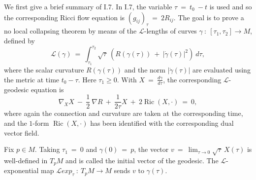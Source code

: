 \documentclass[12pt]{amsart}
\newcommand{\Ric}{\operatorname{Ric}}
\newcommand{\ga}{\gamma}
\numberwithin{equation}{section}
\theoremstyle{plain}
\theoremstyle{definition}
\theoremstyle{remark}
\begin{document}
We first give a brief summary of I.7.
In I.7, the variable $\tau \: = \: t_0 \: - t$ is used and so the
corresponding Ricci flow equation is $(g_{ij})_\tau \: = \: 2 R_{ij}$.
The goal is to prove a no local collapsing theorem
by means of the ${\mathcal L}$-lengths of curves
$\gamma \: : \: [\tau_1, \tau_2] \rightarrow M$, defined by
\begin{equation} \label{defL}
{\mathcal L}(\gamma) \: = \:
\int_{\tau_1}^{\tau_2} \sqrt{\tau} \: \left( R(\gamma(\tau)) \: + \:
\big| \dot{\gamma}(\tau) \big|^2 \right) \: d\tau,
\end{equation}
where the scalar curvature $R(\ga(\tau))$ and the norm $|\dot{\gamma}(\tau)|$
are evaluated using the metric at time $t_0-\tau$.
Here $\tau_1 \ge 0$.
With $X \: = \: \frac{d\gamma}{d\tau}$, 
the corresponding ${\mathcal L}$-geodesic equation is
\begin{equation}
\nabla_X X \: - \: \frac12 \: \nabla R \: + \: \frac{1}{2\tau} X \: + \:
2 \Ric(X, \cdot) \: = \: 0,
\end{equation}
where again the connection and curvature are taken at the corresponding time,
and the $1$-form $\Ric(X,\cdot)$ has been identified with the
corresponding dual vector field.

Fix $p \in M$.
Taking $\tau_1 \: = \: 0$ and $\gamma(0) \: = \: p$,
the vector $v \: = \: \lim_{\tau \rightarrow 0} 
\sqrt{\tau} \: X(\tau)$ is well-defined in $T_pM$
and is called the initial vector of the geodesic. The 
${\mathcal L}$-exponential map ${\mathcal L}exp_\tau \: : \: T_p M
\rightarrow M$ sends $v$ to $\gamma(\tau)$.
\end{document}
